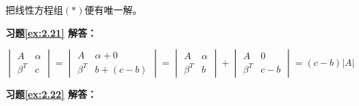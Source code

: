 \documentclass[a4paper]{book}
\begin{document}
把线性方程组$(\ast)$便有唯一解。

\vspace{1.5em}

\textbf{习题\ref{ex:2.21} 解答：}

$$\begin{vmatrix} A & \alpha \\ \beta^T & c \end{vmatrix} = \begin{vmatrix} A & \alpha+0 \\ \beta^T & b+(c-b) \end{vmatrix} = \begin{vmatrix} A & \alpha \\ \beta^T & b \end{vmatrix} + \begin{vmatrix} A & 0 \\ \beta^T & c-b \end{vmatrix} = (c-b)|A|$$

\vspace{1.5em}

\textbf{习题\ref{ex:2.22} 解答：}
\end{document}
